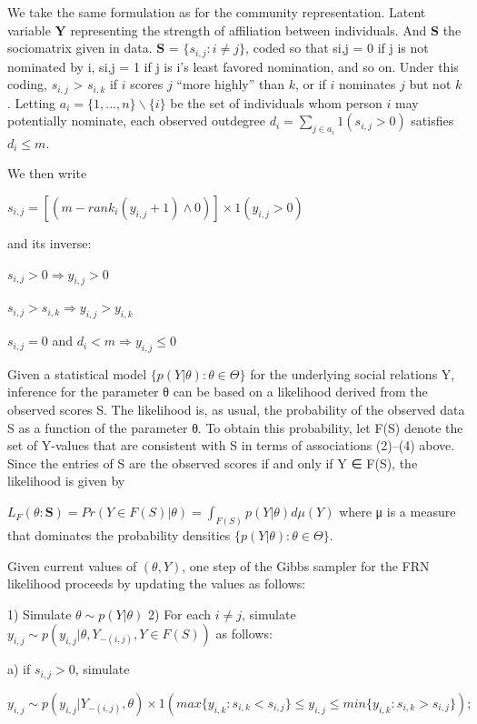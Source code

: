 \documentclass[12pt]{ociamthesis}  %
\begin{document}
	We take the same formulation as for the community representation. Latent variable $\textbf{Y}$ representing the strength of affiliation between individuals. And $\textbf{S}$ the sociomatrix given in data. $\textbf{S}$ =
	$\{ s_{i,j} : i \neq j\}$, coded so that si,j = 0 if j is not nominated by i, si,j = 1 if j is i’s least favored
	nomination, and so on. Under this coding, $s_{i,j}$ > $s_{i,k}$ if $i$ scores $j$ “more highly” than $k$, or if $i$
	nominates $j$ but not $k$. Letting $a_{i} = \{1, ..., n\} \backslash \{i\}$ be the set of individuals whom person $i$ may potentially nominate, each observed outdegree $d_{i} = \sum_{j \in a_{i}} 1(s_{i,j} > 0)$ satisfies $d_{i} \leq m$.
	
	We then write
	
	$s_{i,j} = [(m-rank_{i}(y_{i,j} + 1) \wedge 0)] \times 1(y_{i,j} > 0 )$
	
	and its inverse:
	
	$s_{i,j} > 0 \Rightarrow y_{i,j} > 0$
	
	$s_{i,j} > s_{i,k} \Rightarrow y_{i,j} > y_{i,k}$
	
	$s_{i,j} = 0$ and $d_{i} < m \Rightarrow y_{i,j} \leq 0$
	
	Given a statistical model $\{p(Y|\theta) : \theta \in \Theta \}$ for the underlying social relations Y, inference for
	the parameter θ can be based on a likelihood derived from the observed scores S. The
	likelihood is, as usual, the probability of the observed data S as a function of the parameter
	θ. To obtain this probability, let F(S) denote the set of Y-values that are consistent with S in
	terms of associations (2)–(4) above. Since the entries of S are the observed scores if and
	only if Y ∈ F(S), the likelihood is given by
	
	$L_{F}(\theta : \textbf{S}) = Pr(Y \in F(S) | \theta) = \int_{F(S)} p(Y|\theta) d\mu(Y)$ where μ is a measure that dominates the probability densities $\{p(Y|\theta) : \theta \in \Theta \}$.
	
	
	Given current values of $(\theta, Y)$, one step of the Gibbs sampler for the FRN likelihood proceeds by updating the values as follows:
	
	1) Simulate $\theta \sim p(Y|\theta)$
	2) For each $i \neq j$, simulate $y_{i,j} \sim p(y_{i,j}|\theta, Y_{-(i,j)}, Y \in F(S))$ as follows:
	
	a) if $s_{i,j} > 0$, simulate
	
	$y_{i,j} \sim p(y_{i,j}| Y_{-(i,j)},\theta) \times 1(max \{ y_{i,k} : s_{i,k} < s_{i,j} \} \leq y_{i,j} \leq min \{ y_{i,k} : s_{i,k} > s_{i,j} \} ); $
	
\end{document}
